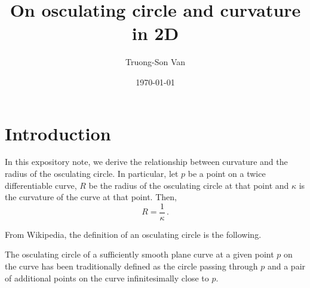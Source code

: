\documentclass[12pt]{amsart}
\title{ On osculating circle and curvature in 2D }
\author{Truong-Son Van}
\date{\today}
\begin{document}
\maketitle


\section{Introduction}
In this expository note, we derive the relationship between curvature and the radius of the osculating circle.
In particular, let $p$ be a point on a twice differentiable curve, $R$ be
the radius of the osculating circle at that point and $\kappa$ is the curvature of the curve 
at that point. Then,
\begin{equation*}
    R = \frac{1}{\kappa} \,.
\end{equation*}


From Wikipedia, the definition of an osculating circle is the following.

\begin{definition}
The osculating circle of a sufficiently smooth plane curve at a given point $p$
on the curve has been traditionally defined as the circle passing through $p$
and a pair of additional points on the curve infinitesimally close to $p$.
\end{definition}

\printbibliography 
%
%
\end{document}
